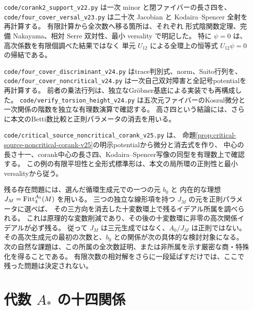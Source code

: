 \nolinkurl{code/corank2_support_v22.py} は一次 minor と閉ファイバーの長さ四を、
\nolinkurl{code/four_cover_versal_v23.py} は二十次 Jacobian と
Kodaira--Spencer 全射を再計算する。
有限計算から全次数へ移る箇所は、それぞれ
形式陰関数定理、完備 Nakayama、相対 Serre 双対性、最小 versality で明記した。
特に $\psi=0$ は、高次係数を有限個調べた結果ではなく
単元 $U_{12}$ による全環上の恒等式 $U_{12}\psi=0$ の帰結である。

\nolinkurl{code/four_cover_discriminant_v24.py} はtrace判別式、norm、Saito行列を、
\nolinkurl{code/four_cover_noncritical_v24.py} は一次自己双対障害と全記号potentialを再計算する。
前者の乗法行列は、独立なGröbner基底による実装でも再構成した。
\nolinkurl{code/verify_torsion_height_v24.py} は五次元ファイバーのKoszul微分と
一次関係の階数を独立な有理数演算で確認する。
高さ四という結論には、さらに本文のBetti数比較と正則パラメータの消去を用いる。

\nolinkurl{code/critical_source_noncritical_corank_v25.py} は、
命題\ref{prop:critical-source-noncritical-corank-v25}の明示potentialから微分と消去式を作り、
中心の長さ十一、corank中心の長さ四、Kodaira--Spencer写像の同型を有理数上で確認する。
この例の有限平坦性と全形式標準形は、本文の局所環の正則性と最小versalityから従う。

残る存在問題には、選んだ循環生成元での一つの元 $b_0$ と
内在的な理想 $J_M=\operatorname{Fitt}_4^{A_0}(M)$ を用いる。
三つの独立な線形項を持つ $J_M$ の元を正則パラメータに選べば、
その三方向を消去した十変数環上で残るイデアル所属を調べられる。
これは原理的な変数削減であり、その後の十変数環に非零の高次関係イデアルが必ず残る。
従って $J_M$ は三元生成ではなく、$A_0/J_M$ は正則ではない。
その高次生成元の最初の次数と、$b_0$ との関係が次の具体的な検討対象になる。
次の自然な課題は、この所属の全次数証明、または非所属を示す厳密な商・特殊化を得ることである。
有限次数の相対解をさらに一段延ばすだけでは、ここで残った問題は決定されない。

\appendix
\section{代数 $A_*$ の十四関係}\label{app:relations}

